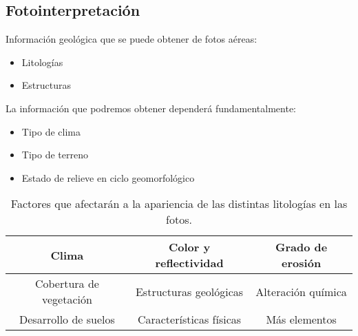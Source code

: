 \subsection{Fotointerpretación}

Información geológica que se puede obtener de fotos aéreas:
\begin{itemize}
  \item Litologías
  \item Estructuras
\end{itemize}
La información que podremos obtener dependerá fundamentalmente:
\begin{itemize}
  \item Tipo de clima
  \item Tipo de terreno
  \item Estado de relieve en ciclo geomorfológico
\end{itemize}

\begin{table}[h!]
  \centering\begin{tabular}{|c|c|c|}
  \hline
  Clima                   & Color y reflectividad   & Grado de erosión   \\ \hline
  Cobertura de vegetación & Estructuras geológicas  & Alteración química \\ \hline
  Desarrollo de suelos    & Características físicas & Más elementos      \\ \hline
  \end{tabular}
  \caption{Factores que afectarán a la apariencia de las distintas litologías en las fotos.}
  \label{tabt2}
  \end{table}

%
%
%
%

